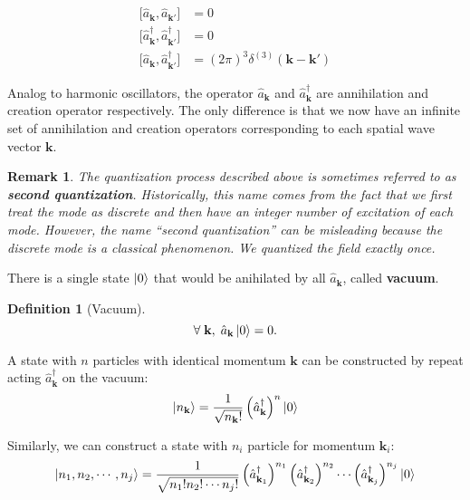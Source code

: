 \documentclass[12pt]{article}
\numberwithin{equation}{section}
\theoremstyle{1style}
\newtheorem{definition}[equation]{Definition}
\newtheorem*{remark}{Remark}
\newcommand{\tbf}[1]{\textbf{#1}}
\begin{document}
\begin{align}
  \bigl[\hat{a}_{\mathbf{k}},\hat{a}_{\mathbf{k'}}\bigr]                     & =0                                      \\
  \bigl[\hat{a}^{\dagger}_{\mathbf{k}},\hat{a}^{\dagger}_{\mathbf{k'}}\bigr] & =0                                      \\
  \bigl[\hat{a}_{\mathbf{k}},\hat{a}^{\dagger}_{\mathbf{k'}}\bigr]           & =(2\pi)^3\delta^{(3)}(\mathbf{k}-\mathbf{k'})
\end{align}


Analog to harmonic oscillators, the operator \(\hat{a}_{\mathbf{k}}\) and
\(\hat{a}^{\dagger}_{\mathbf{k}}\) are annihilation and creation operator respectively.
The only difference is that we now have an infinite set of annihilation and creation operators corresponding to each spatial wave vector \(\mathbf{k}\).

\begin{remark}
  The quantization process described above is sometimes referred to as \tbf{second quantization}. Historically, this name
  comes from the fact that we first treat the mode as discrete and then have an integer number of excitation of each mode.
  However, the name ``second quantization'' can be misleading because the discrete mode is a classical phenomenon.
  We quantized the field exactly once.
\end{remark}


There is a single state \(\ket{0}\) that would be anihilated by all \(\hat{a}_{\mathbf{k}}\), called \tbf{vacuum}.
\begin{definition}[Vacuum]
  \[\forall\; \mathbf{k},\; \hat{a}_{\mathbf{k}}\ket{0}=0.\]
\end{definition}

A state with \(n\) particles with identical momentum \(\mathbf{k}\) can be constructed by repeat acting \(\hat{a}^{\dagger}_{\mathbf{k}}\)
on the vacuum:
\begin{equation}
  \ket{n_{\mathbf{k}}}=\frac{1}{\sqrt{n_{\mathbf{k}}!}}\left(\hat{a}^{\dagger}_{\mathbf{k}}\right)^{n}\ket{0}
\end{equation}

Similarly, we can construct a state with \(n_{i}\) particle for momentum \(\mathbf{k}_i\):
\begin{equation}
  \ket{n_1,n_2,\cdots,n_j}=\frac{1}{\sqrt{n_1!n_2!\cdots n_j!}}\left(\hat{a}^{\dagger}_{\mathbf{k}_1}\right)^{n_1}
  \left(\hat{a}^{\dagger}_{\mathbf{k}_2}\right)^{n_2}\cdots \left(\hat{a}^{\dagger}_{\mathbf{k}_j}\right)^{n_j}\ket{0}
\end{equation}
\end{document}
